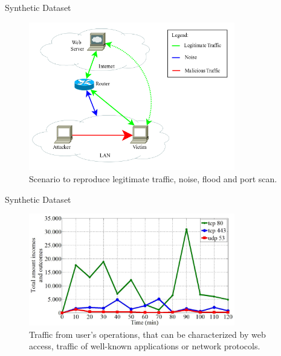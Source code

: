 \documentclass[newPxFont, numfooter, sectionpages]{beamer}
\begin{document}
\begin{frame}[c]{Synthetic Dataset}
	
	\begin{figure}[h!]
	     \centering
	     \includegraphics[width=9cm]{../figures/fig09.png}
	     \caption{Scenario to reproduce legitimate traffic, noise, flood and port scan.}
	     \label{fig:2_fig1}
	\end{figure}

\end{frame}
\begin{frame}[c]{Synthetic Dataset}
	
	\begin{figure}[h!]
	     \centering 
	     \includegraphics[width=9cm]{../figures/fig03.png}
	     \caption{Traffic from user's operations, that can be characterized by web access, traffic of well-known applications or network protocols.}
	     \label{fig:2_fig3}
	\end{figure}

\end{frame}
\end{document}
